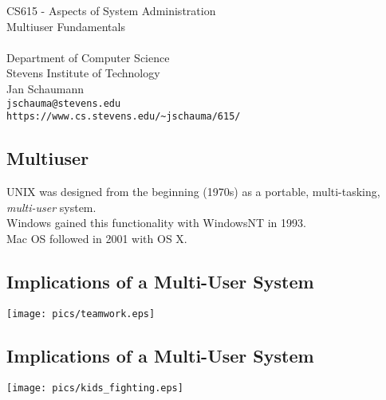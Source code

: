\documentclass[xga]{xdvislides}
\begin{document}
\setfontphv

\lhead{\slidetitle}                               %
\cfoot{\relax}                               %
\rfoot{\Gray{\today}}

\vspace*{\fill}
\begin{center}
	\Hugesize
		CS615 - Aspects of System Administration\\ [1em]
		Multiuser Fundamentals\\ [1em]
	\hspace*{5mm}\blueline\\ [1em]
	\Normalsize
		Department of Computer Science\\
		Stevens Institute of Technology\\
		Jan Schaumann\\
		\verb+jschauma@stevens.edu+\\
		\verb+https://www.cs.stevens.edu/~jschauma/615/+
\end{center}
\vspace*{\fill}

\subsection{Multiuser}

UNIX was designed from the beginning (1970s) as a portable, multi-tasking,
{\em multi-user} system. \\

Windows gained this functionality with WindowsNT in 1993. \\

Mac OS followed in 2001 with OS X.

\subsection{Implications of a Multi-User System}
\vspace*{\fill}
\begin{center}
	\texttt{[image: pics/teamwork.eps]}
\end{center}
\vspace*{\fill}

\subsection{Implications of a Multi-User System}
\vspace*{\fill}
\begin{center}
	\texttt{[image: pics/kids\_fighting.eps]}
\end{center}
\vspace*{\fill}
\end{document}
